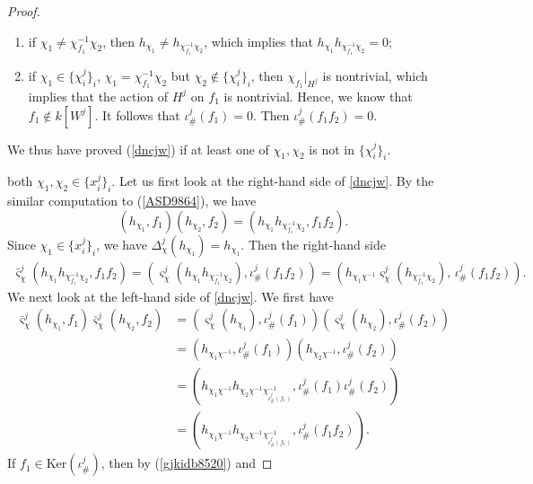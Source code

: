 \documentclass[11pt,reqno]{amsart}
\theoremstyle{definition}
\begin{document}
\begin{proof}
\begin{enumerate}
\item[(2)] if $\chi_1 \neq \chi^{-1}_{f_1} \chi_2$, then 
$h_{\chi_1} \neq h_{\chi^{-1}_{f_1} \chi_2}$, which implies that  
$h_{\chi_1} h_{\chi^{-1}_{f_1} \chi_2} = 0$; 

\item[(3)] if $\chi_1 \in \{\chi_i^j\}_i$, $\chi_1 = \chi^{-1}_{f_1} \chi_2$ but $\chi_2 
\notin \{\chi_i^j\}_i$, then $\chi_{f_1}|_{H^j}$ is nontrivial, which implies that the action of 
$H^j$ on $f_1$ is nontrivial. Hence, we know that $f_1 \notin k[W^j]$. 
It follows that $\iota^j_{\#}(f_1) = 0$. Then $\iota^j_{\#}(f_1 f_2) = 0$. 
\end{enumerate}
We thus have proved
(\ref{dncjw}) if at least 
one of $\chi_1, \chi_2$ is not in $\{\chi_i^j\}_i$.

\vspace{2mm}
both
$\chi_1,\chi_2 \in \{x_i^j\}_i$.
Let us first look at the right-hand
side of \eqref{dncjw}.
By the similar computation 
to (\ref{ASD9864}), 
we have 
$$
(h_{\chi_1}, f_1) (h_{\chi_2}, f_2) = (h_{\chi_1} h_{\chi^{-1}_{f_1} \chi_2}, f_1 f_2). 
$$
Since $\chi_1 \in \{x_i^j\}_i$, we have $\Delta^{j}_{\chi}(h_{\chi_1}) = h_{\chi_1}$. 
Then the right-hand side
\begin{align}\label{gjkidb8520}
\bar{\varsigma}^{j}_{\chi}(h_{\chi_1} h_{\chi^{-1}_{f_1} \chi_2}, f_1 f_2) 
= ( \varsigma^{j}_{\chi}(h_{\chi_1} h_{\chi^{-1}_{f_1} \chi_2}), \iota^j_{\#}(f_1 f_2) ) = 
( h_{\chi_1 \chi^{-1}} \varsigma^{j}_{\chi}(h_{\chi^{-1}_{f_1} \chi_2} ),\, 
\iota^j_{\#}(f_1 f_2) ).
\end{align}
We next look at the left-hand
side of \eqref{dncjw}. We first have 
\begin{align}
\bar{\varsigma}^{j}_{\chi}(h_{\chi_1}, f_1)\bar{\varsigma}^{j}_{\chi}(h_{\chi_2}, f_2) 
& = ( \varsigma^{j}_{\chi}(h_{\chi_1}), \iota^j_{\#}(f_1) ) 
( \varsigma^{j}_{\chi}(h_{\chi_2}), \iota^j_{\#}(f_2) ) \nonumber \\ 
& = (h_{\chi_1 \chi^{-1}}, \iota^j_{\#}(f_1) ) ( h_{\chi_2 \chi^{-1}}, 
\iota^j_{\#}(f_2) ) \nonumber \\
& = ( h_{\chi_1 \chi^{-1}} h_{\chi_2 \chi^{-1}\chi_{\iota^j_{\#}(f_1)}^{-1}}, 
\iota^j_{\#}(f_1) \iota^j_{\#}(f_2) ) \nonumber \\
& = (h_{\chi_1 \chi^{-1}} h_{\chi_2 \chi^{-1}\chi_{\iota^j_{\#}(f_1)}^{-1}}, \iota^j_{\#}(f_1 f_2) ).  
\label{BJGC61037}
\end{align}
If
$f_1 \in \mathrm{Ker}
(\iota^j_{\#})$, then by 
(\ref{gjkidb8520}) and 

\end{proof}
\end{document}
